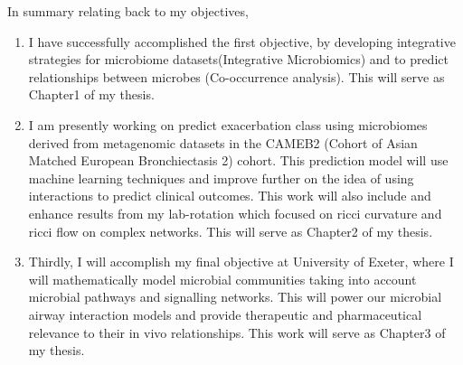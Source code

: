 In summary relating back to my objectives, 
\begin{enumerate}
	\item I have successfully accomplished the first objective, by developing integrative strategies for microbiome datasets(Integrative Microbiomics) and to predict relationships between microbes (Co-occurrence analysis). This will serve as Chapter1 of my thesis. 
	\item I am presently working on predict exacerbation class using microbiomes derived from metagenomic datasets in the CAMEB2 (Cohort of Asian Matched European Bronchiectasis 2) cohort. This prediction model will use machine learning techniques and improve further on the idea of using interactions to predict clinical outcomes. This work will also include and enhance results from my lab-rotation which focused on ricci curvature and ricci flow on complex networks. This will serve as Chapter2 of my thesis.
	\item Thirdly, I will accomplish my final objective at University of Exeter, where I will mathematically model microbial communities taking into account microbial pathways and signalling networks. This will power our microbial airway interaction models and provide therapeutic and pharmaceutical relevance to their in vivo relationships. This work will serve as Chapter3 of my thesis.
\end{enumerate}